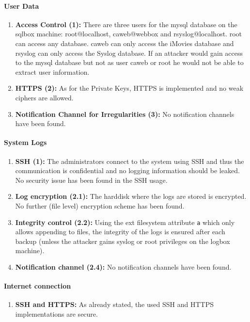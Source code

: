 \documentclass[english]{article}
\begin{document}
\paragraph{User Data}
\begin{enumerate}[label=(\alph*)]
\item \textbf{Access Control (1):} There are three users for the mysql database on the sqlbox machine: root@localhost, caweb@webbox and rsyslog@localhost. root can access any database. caweb can only access the iMovies database and rsyslog can only access the Syslog database. If an attacker would gain access to the mysql database but not as user caweb or root he would not be able to extract user information.
\item \textbf{HTTPS (2):} As for the Private Keys, HTTPS is implemented and no weak ciphers are allowed.
\item \textbf{Notification Channel for Irregularities (3):} No notification channels have been found.
\end{enumerate}

\paragraph{System Logs} 
\begin{enumerate}[label=(\alph*)]
	\item \textbf{SSH (1):} The administrators connect to the system using SSH and thus the communication is confidential and no logging information should be leaked. No security issue has been found in the SSH usage.
	\item \textbf{Log encryption (2.1):} The harddisk where the logs are stored is encrypted. No further (file level) encryption scheme has been found.
	\item \textbf{Integrity control (2.2):} Using the ext filesystem attribute \texttt{a} which only allows appending to files, the integrity of the logs is ensured after each backup (unless the attacker gains syslog or root privileges on the logbox machine).
	\item \textbf{Notification channel (2.4):} No notification channels have been found.
\end{enumerate}

\paragraph{Internet connection} 
\begin{enumerate}[label=(\alph*)]
	\item \textbf{SSH and HTTPS:} As already stated, the used SSH and HTTPS implementations are secure.
\end{enumerate}
\end{document}
